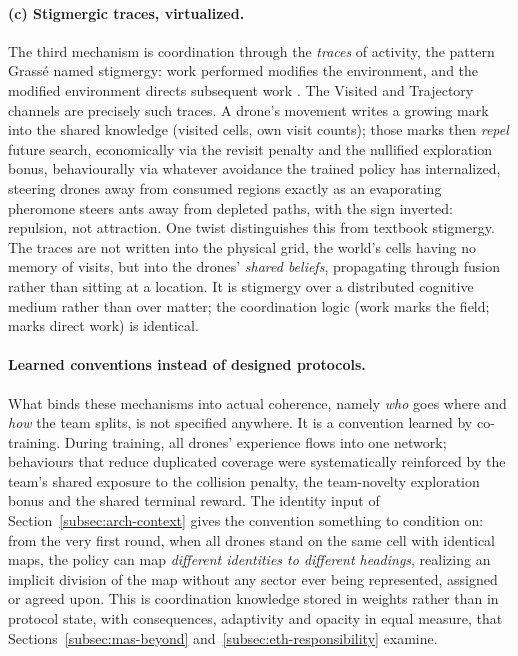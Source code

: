 \paragraph{(c) Stigmergic traces, virtualized.}
The third mechanism is coordination through the \emph{traces} of activity, the
pattern Grass\'e named stigmergy: work performed modifies the environment, and
the modified environment directs subsequent work
\citep{grasse1959reconstruction,parunak1997go}. The Visited and Trajectory
channels are precisely such traces. A drone's movement writes a growing mark into
the shared knowledge (visited cells, own visit counts); those marks then
\emph{repel} future search, economically via the revisit penalty and the
nullified exploration bonus, behaviourally via whatever avoidance the trained
policy has internalized, steering drones away from consumed regions exactly as an
evaporating pheromone steers ants away from depleted paths, with the sign
inverted: repulsion, not attraction. One twist distinguishes this from textbook
stigmergy. The traces are not written into the physical grid, the world's cells
having no memory of visits, but into the drones' \emph{shared beliefs},
propagating through fusion rather than sitting at a location. It is stigmergy
over a distributed cognitive medium rather than over matter; the coordination
logic (work marks the field; marks direct work) is identical.

\paragraph{Learned conventions instead of designed protocols.}
What binds these mechanisms into actual coherence, namely \emph{who} goes where
and \emph{how} the team splits, is not specified anywhere. It is a convention
learned by co-training. During training, all drones' experience flows into one
network; behaviours that reduce duplicated coverage were systematically
reinforced by the team's shared exposure to the collision penalty, the
team-novelty exploration bonus and the shared terminal reward. The identity input
of Section~\ref{subsec:arch-context} gives the convention something to condition
on: from the very first round, when all drones stand on the same cell with
identical maps, the policy can map \emph{different identities to different
headings}, realizing an implicit division of the map without any sector ever
being represented, assigned or agreed upon. This is coordination knowledge stored
in weights rather than in protocol state, with consequences, adaptivity and
opacity in equal measure, that Sections~\ref{subsec:mas-beyond}
and~\ref{subsec:eth-responsibility} examine.

